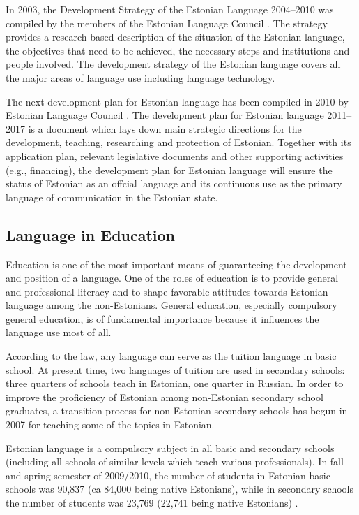 \begin{multicols}{2}
In 2003, the Development Strategy of the Estonian Language 2004--2010 was compiled by the members of the Estonian Language Council \cite{KeeleStratEn}. 
The strategy provides a research-based description of the situation of the Estonian language, the objectives that need to be achieved, the necessary steps and institutions and people involved. 
The development strategy of the Estonian language covers all the major areas of language use including language technology.

The next development plan for Estonian language has been compiled in 2010 by Estonian Language Council \cite{DevPlan}. 
The development plan for Estonian language 2011--2017 is a document which lays down main strategic directions for the development, teaching, researching and protection of Estonian. 
Together with its application plan, relevant legislative documents and other supporting activities (e.g., ﬁnancing), the development plan for Estonian language will ensure the status of Estonian as an offcial language and its continuous use as the primary language of communication in the Estonian state.

\subsection{Language in Education}

Education is one of the most important means of guaranteeing the development and position of a language. 
One of the roles of education is to provide general and professional literacy and to shape favorable attitudes towards Estonian language among the non-Estonians. 
General education, especially compulsory general education, is of fundamental importance because it inﬂuences the language use most of all.

According to the law, any language can serve as the tuition language in basic school. 
At present time, two languages of tuition are used in secondary schools: three quarters of schools teach in Estonian, one quarter in Russian. 
In order to improve the proﬁciency of Estonian among non-Estonian secondary school graduates, a transition process for non-Estonian secondary schools has begun in 2007 for teaching some of the topics in Estonian.

Estonian language is a compulsory subject in all basic and secondary schools (including all schools of similar levels which teach various professionals). 
In fall and spring semester of 2009/2010, the number of students in Estonian basic schools was 90,837 (ca 84,000 being native Estonians), while in secondary schools the number of students was 23,769 (22,741 being native Estonians) \cite{DevPlan}.


\end{multicols}
